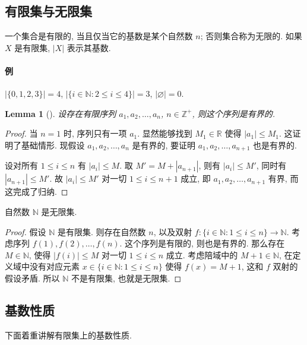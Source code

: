 \documentclass[UTF8]{ctexart}
\theoremstyle{mystyle}
\newtheorem{lemma}{Lemma}[section]
\theoremstyle{myremark}
\theoremstyle{plain}
\newcommand{\R}{\mathbb R}
\newcommand{\Z}{\mathbb Z}
\newcommand{\N}{\mathbb N}
\newcommand{\set}[1]{\{#1\}}
\begin{document}
\subsection{有限集与无限集}
\begin{definition}
    一个集合是有限的, 当且仅当它的基数是某个自然数 $ n $; 否则集合称为无限的. 如果 $ X $ 是有限集, $ |X| $ 表示其基数.
\end{definition}

\paragraph{例}
$ |\set{0, 1, 2, 3}| = 4 $, $ |\set{i \in \N \colon 2 \leqslant i \leqslant 4}| = 3 $, $ |\varnothing| = 0 $.

\begin{lemma}[]
    设存在有限序列 $ a_1, a_2, \dots, a_n $, $ n \in \Z^+ $, 则这个序列是有界的.
\end{lemma}

\begin{proof}
    当 $ n = 1 $ 时, 序列只有一项 $ a_1 $. 显然能够找到 $ M_1 \in \R $ 使得 $ |a_1| \leqslant M_1 $. 这证明了基础情形. 现假设 $ a_1, a_2, \dots, a_n $ 是有界的, 要证明 $ a_1, a_2, \dots, a_{n + 1} $ 也是有界的.

    设对所有 $ 1 \leqslant i \leqslant n $ 有 $ |a_i| \leqslant M $. 取 $ M' = M + |a_{n + 1}| $, 则有 $ |a_i| \leqslant M' $, 同时有 $ |a_{n + 1}| \leqslant M' $. 故 $ |a_i| \leqslant M' $ 对一切 $ 1 \leqslant i \leqslant n+1 $ 成立, 即 $ a_1, a_2, \dots, a_{n + 1} $ 有界, 而这完成了归纳.
\end{proof}


\begin{theorem}
    自然数 $ \N $ 是无限集.
\end{theorem}

\begin{proof}
    假设 $ \N $ 是有限集. 则存在自然数 $ n $, 以及双射 $ f \colon \set{i \in \N \colon 1 \leqslant i \leqslant n} \to \N $. 考虑序列 $ f(1), f(2), \dots, f(n) $. 这个序列是有限的, 则也是有界的. 那么存在 $ M \in \N $, 使得 $ |f(i)| \leqslant M $ 对一切 $ 1 \leqslant i \leqslant n $ 成立. 考虑陪域中的 $ M + 1 \in \N $, 在定义域中没有对应元素 $ x \in \set{i \in \N \colon 1 \leqslant i \leqslant n} $ 使得 $ f(x) = M + 1 $, 这和 $ f $ 双射的假设矛盾. 所以 $ \N $ 不是有限集, 也就是无限集.
\end{proof}

\subsection{基数性质}
下面着重讲解有限集上的基数性质.
\end{document}
